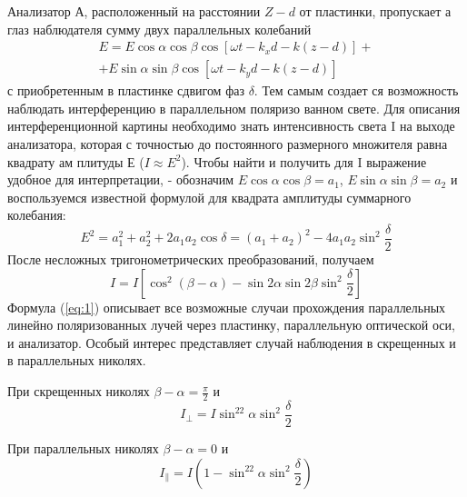 Анализатор А, расположенный на расстоянии $Z-d$ от
пластинки, пропускает а глаз наблюдателя сумму двух параллельных
колебаний 
\begin{gather}
	E=E\cos\alpha\cos\beta\cos\left[\omega t -k_xd-k(z-d) \right]+\\
	+E\sin\alpha\sin\beta\cos\left[\omega t -k_yd-k(z-d) \right]
\end{gather}
с приобретенным в пластинке сдвигом фаз $\delta$. Тем самым создает­
ся возможность наблюдать интерференцию в параллельном поляризо­
ванном свете. Для описания интерференционной картины необходимо
знать интенсивность света I на выходе анализатора, которая с
точностью до постоянного размерного множителя равна квадрату ам­
плитуды Е ($I\approx E^2$). Чтобы найти и получить для I выражение
удобное для интерпретации, - обозначим $E\cos\alpha\cos\beta=a_1$,
$E\sin\alpha\sin\beta=a_2$  и воспользуемся известной формулой
для квадрата амплитуды суммарного колебания:
\begin{equation}
	E^2=a_1^2+a_2^2+2a_1a_2\cos\delta=(a_1+a_2)^2-4a_1a_2\sin^2\frac{\delta}{2}
\end{equation}
После несложных тригонометрических преобразований, получаем
\begin{equation}
	\label{eq:1}
	I=I\left[\cos^2(\beta-\alpha)-\sin2\alpha\sin2\beta\sin^2\frac{\delta}{2} \right]
\end{equation}
Формула (\ref{eq:1}) описывает все возможные случаи прохождения параллельных линейно поляризованных лучей через пластинку, параллельную
оптической оси, и анализатор. Особый интерес представляет слу­чай наблюдения в скрещенных и в параллельных николях.

При скрещенных николях $\beta-\alpha=\frac{\pi}{2}$ и
\begin{equation}
	\label{eq:3bot}
	I_{\bot}=I\sin^22\alpha \sin^2\frac{\delta}{2}
\end{equation}

При параллельных николях $\beta-\alpha=0$ и 
\begin{equation}
	\label{eq:3par}
	I_{\|}=I\left(1-\sin^22\alpha \sin^2\frac{\delta}{2}\right)
\end{equation}

